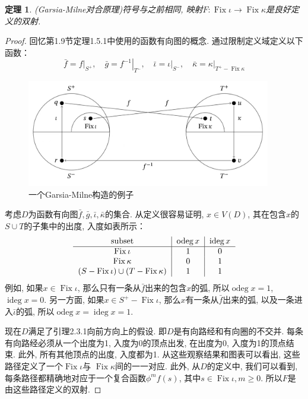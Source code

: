 \documentclass{ctexbook}
\newtheorem{thm}{定理}[section]
\begin{document}
\begin{thm}
	(Garsia-Milne对合原理)符号与之前相同, 映射$F:\operatorname{Fix}\iota \rightarrow \operatorname{Fix}\kappa$是良好定义的双射.
\end{thm}
\begin{proof}
	回忆第1.9节定理1.5.1中使用的函数有向图的概念. 通过限制定义域定义以下函数：
	\[
	\bar{f}=\left.f\right|_{S^{+}},\quad\bar{g}=\left.f^{-1}\right|_{T^{-}},\quad\bar{\iota}=\left.\iota\right|_{S^{-}},\quad\bar{\kappa}=\left.\kappa\right|_{T^{+}-\operatorname{Fix}\kappa}
	\]
	\begin{figure}[htbp]
		\centering
		\includegraphics*[width=0.95\textwidth]{./fig2/3.jpg}
		\caption{一个Garsia-Milne构造的例子}
	\end{figure}
	考虑$D$为函数有向图$\bar{f},\bar{g},\bar\iota,\bar\kappa$的集合. 从定义很容易证明, $x\in V(D)$, 其在包含$x$的$S\cup T$的子集中的出度, 入度如表所示：
	\[
	\begin{tabular}{c|c|c}
	subset & $\operatorname{odeg}x$ & $\operatorname{ideg}x$ \\
	\hline
	$\operatorname{Fix}\iota$ & 1 & 0 \\
	$\operatorname{Fix}\kappa$ & 0 & 1 \\
	$(S-\operatorname{Fix}\iota)\cup (T-\operatorname{Fix}\kappa)$ & 1 & 1 \\
	\end{tabular}
	\]
	例如, 如果$x\in \operatorname{Fix}\iota$, 那么只有一条从$\bar{f}$出来的包含$x$的弧, 所以$\operatorname{odeg}x=1$,$\operatorname{ideg}x=0$. 另一方面, 如果$x\in S^{+}-\operatorname{Fix}\iota$, 那么$x$有一条从$\bar{f}$出来的弧, 以及一条进入$\bar{\iota}$的弧, 所以$\operatorname{odeg}x=\operatorname{ideg}x=1$.
	
	现在$D$满足了引理2.3.1向前方向上的假设. 即$D$是有向路经和有向圈的不交并. 每条有向路经必须从一个出度为1, 入度为0的顶点出发, 在出度为0, 入度为1的顶点结束. 此外, 所有其他顶点的出度, 入度都为1. 从这些观察结果和图表可以看出, 这些路径定义了一个$\operatorname{Fix}\iota$与
	$\operatorname{Fix}\kappa$间的一一对应. 此外, 从$D$的定义中, 我们可以看到, 每条路径都精确地对应于一个复合函数$\phi^{m}f(s)$, 其中$s\in \operatorname{Fix}\iota,m\geq 0$. 所以$F$是由这些路径定义的双射.
\end{proof}
\end{document}
